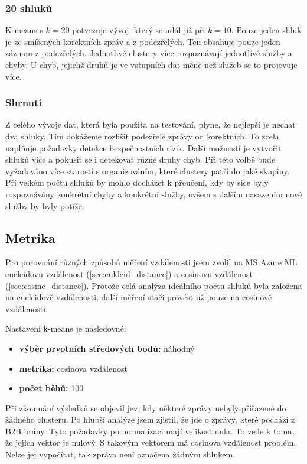 \documentclass[thesis=M,czech]{FITthesis}[2012/10/20]
\begin{document}
				\subsubsection{20 shluků}
				K-means s $k = 20$ potvrzuje vývoj, který se udál již při $k = 10$. Pouze jeden shluk je ze smíšených korektních zpráv a z podezřelých. Ten obsahuje pouze jeden záznam z podezřelých. Jednotlivé clustery více rozpoznávají jednotlivé služby a chyby. U chyb, jejichž druhů je ve vstupních dat méně než služeb se to projevuje více.
				
				\subsubsection{Shrnutí}
					Z celého vývoje dat, která byla použita na testování, plyne, že nejlepší je nechat dva shluky. Tím dokážeme rozlišit podezřelé zprávy od korektních. To zcela naplňuje požadavky detekce bezpečnostních rizik. Další možností je vytvořit shluků více a pokusit se i detekovat různé druhy chyb. Při této volbě bude vyžadováno více starostí s organizováním, které clustery patří do jaké skupiny. Při velkém počtu shluků by mohlo docházet k přeučení, kdy by sice byly rozpoznávány konkrétní chyby a konkrétní služby, ovšem s dalším nasazením nové služby by byly potíže.
		
		\subsection{Metrika}
			Pro porovnání různých způsobů měření vzdálenosti jsem zvolil na MS Azure ML eucleidovu vzdálenost (\ref{sec:eukleid_distance}) a cosinovu vzdálenost (\ref{sec:cosine_distance}). Protože celá analýza ideálního počtu shluků byla založena na eucleidově vzdálenosti, další měření stačí provést už pouze na cosinově vzdálenosti.
			
			Nastavení k-means je následovné:
			\begin{itemize} 
				\item \textbf{výběr prvotních středových bodů: } náhodný
				\item \textbf{metrika: } cosinova vzdálenost
				\item \textbf{počet běhů: } 100		
			\end{itemize}
		
			Při zkoumání výsledků se objevil jev, kdy některé zprávy nebyly přiřazené do žádného clusteru. Po hlubší analýze jsem zjistil, že jde o zprávy, které pochází z B2B brány. Tyto požadavky po normalizaci mají velikost nula. To vede k tomu, že jejich vektor je nulový. S takovým vektorem má cosinova vzdálenost problém. Nelze jej vypočítat, tak zpráva není označena žádným shlukem.
			
\end{document}
